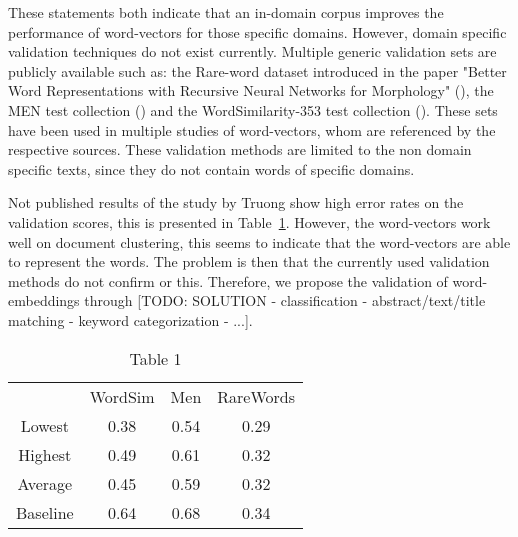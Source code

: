 \documentclass[../../Thesis.tex]{subfiles}
\begin{document}
These statements both indicate that an in-domain corpus improves the performance of word-vectors for those specific domains. However, domain specific validation techniques do not exist currently. Multiple generic validation sets are publicly available such as:
the Rare-word dataset introduced in the paper "Better Word Representations with Recursive Neural Networks for Morphology" (\citet{luong2013better}), 
the MEN test collection (\citet{EBruniMENCollection}) and the WordSimilarity-353 test collection (\citet{EGabrilovichWScollection}).
These sets have been used in multiple studies of word-vectors, whom are referenced by the respective sources.  These validation methods are limited to the non domain specific texts, since they do not contain words of specific domains.

Not published results of the study by Truong show high error rates on the validation scores, this is presented in Table~\ref{table:truongErrorRates}. However, the word-vectors work well on document clustering, this seems to indicate that the word-vectors are able to represent the words. The problem is then that the currently used validation methods do not confirm or this. Therefore, we propose the validation of word-embeddings through [TODO: SOLUTION - classification - abstract/text/title matching - keyword categorization - ...].

\begin{table}
\begin{tabular}{c c c c}
&WordSim & Men & RareWords\\
Lowest & 0.38 & 0.54 & 0.29 \\
Highest & 0.49 & 0.61 & 0.32\\
Average & 0.45 & 0.59 & 0.32\\
Baseline & 0.64 & 0.68 & 0.34
\end{tabular}
\caption{Table 1}\label{table:truongErrorRates}
\end{table}
\newpage
\end{document}
